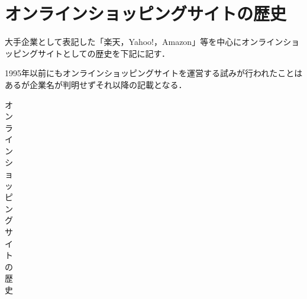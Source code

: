 \newpage






\section{オンラインショッピングサイトの歴史}

大手企業として表記した「楽天，Yahoo!，Amazon」等を中心にオンラインショッピングサイトとしての歴史を下記に記す．

1995年以前にもオンラインショッピングサイトを運営する試みが行われたことはあるが企業名が判明せずそれ以降の記載となる．


\begin{table}[htb]

\label{オンラインショッピングサイトの歴史}
  \begin{center}
    \caption{オンラインショッピングサイトの歴史}
\newlength{\myheight}
\setlength{\myheight}{0.7cm}

\begin{tabular}{|r||l|}
\hline


\end{tabular}
\end{center}
\end{table}
